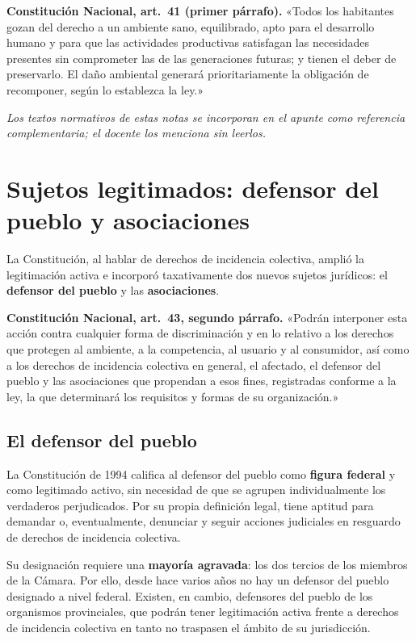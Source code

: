 \documentclass[12pt,oneside]{book}
\begin{document}
\begin{note}
\textbf{Constitución Nacional, art.\ 41 (primer párrafo).} «Todos los habitantes gozan del derecho a un ambiente sano, equilibrado, apto para el desarrollo humano y para que las actividades productivas satisfagan las necesidades presentes sin comprometer las de las generaciones futuras; y tienen el deber de preservarlo. El daño ambiental generará prioritariamente la obligación de recomponer, según lo establezca la ley.»

\textit{Los textos normativos de estas notas se incorporan en el apunte como referencia complementaria; el docente los menciona sin leerlos.}
\end{note}

\section{Sujetos legitimados: defensor del pueblo y asociaciones}

La Constitución, al hablar de derechos de incidencia colectiva, amplió la legitimación activa e incorporó taxativamente dos nuevos sujetos jurídicos: el \textbf{defensor del pueblo} y las \textbf{asociaciones}.

\begin{note}
\textbf{Constitución Nacional, art.\ 43, segundo párrafo.} «Podrán interponer esta acción contra cualquier forma de discriminación y en lo relativo a los derechos que protegen al ambiente, a la competencia, al usuario y al consumidor, así como a los derechos de incidencia colectiva en general, el afectado, el defensor del pueblo y las asociaciones que propendan a esos fines, registradas conforme a la ley, la que determinará los requisitos y formas de su organización.»
\end{note}

\subsection{El defensor del pueblo}

La Constitución de 1994 califica al defensor del pueblo como \textbf{figura federal} y como legitimado activo, sin necesidad de que se agrupen individualmente los verdaderos perjudicados. Por su propia definición legal, tiene aptitud para demandar o, eventualmente, denunciar y seguir acciones judiciales en resguardo de derechos de incidencia colectiva.

Su designación requiere una \textbf{mayoría agravada}: los dos tercios de los miembros de la Cámara. Por ello, desde hace varios años no hay un defensor del pueblo designado a nivel federal. Existen, en cambio, defensores del pueblo de los organismos provinciales, que podrán tener legitimación activa frente a derechos de incidencia colectiva en tanto no traspasen el ámbito de su jurisdicción.
\end{document}

